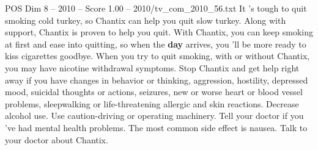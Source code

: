 \begin{textsample}{POS Dim 8 – 2010 – Score 1.00 – 2010/tv\_com\_2010\_56.txt}  \label{ex:f8_pos_055}
It 's tough to quit smoking cold turkey, so Chantix can help you quit slow turkey.
Along with support, Chantix is proven to help you quit.
With Chantix, you can keep smoking at first and ease into quitting, so when the \textbf{day} arrives, you 'll be more ready to kiss cigarettes goodbye.
When you try to quit smoking, with or without Chantix, you may have nicotine withdrawal symptoms.
Stop Chantix and get help right away if you have changes in behavior or thinking, aggression, hostility, depressed mood, suicidal thoughts or actions, seizures, new or worse heart or blood vessel problems, sleepwalking or life-threatening allergic and skin reactions.
Decrease alcohol use.
Use caution-driving or operating machinery.
Tell your doctor if you 've had mental health problems.
The most common side effect is nausea.
Talk to your doctor about Chantix.

\end{textsample}
